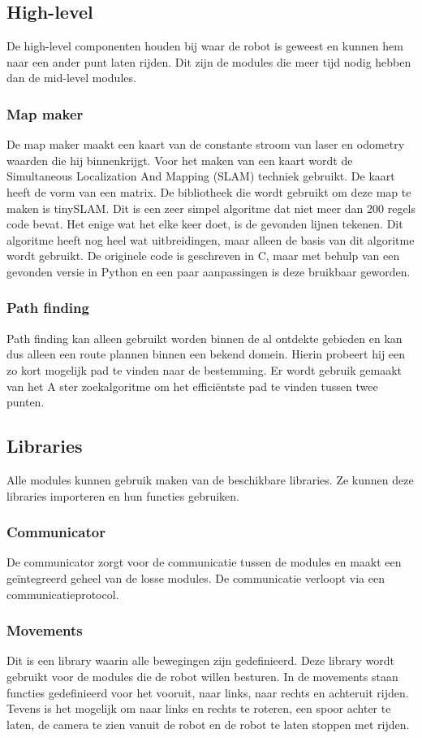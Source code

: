 \documentclass[a4paper,10pt]{article}
\begin{document}
\subsection{High-level}
De high-level componenten houden bij waar de robot is geweest en kunnen hem naar een ander punt laten rijden. Dit zijn de modules die meer tijd nodig hebben dan de mid-level modules.

\subsubsection{Map maker}
De map maker maakt een kaart van de constante stroom van laser en odometry waarden die hij binnenkrijgt. Voor het maken van een kaart wordt de Simultaneous Localization And Mapping (SLAM) techniek gebruikt. De kaart heeft de vorm van een matrix.
De bibliotheek die wordt gebruikt om deze map te maken is tinySLAM. Dit is een zeer simpel algoritme dat niet meer dan 200 regels code bevat. Het enige wat het elke keer doet, is de gevonden lijnen tekenen. Dit algoritme heeft nog heel wat uitbreidingen, maar alleen de basis van dit algoritme wordt gebruikt. De originele code is geschreven in C, maar met behulp van een gevonden versie in Python en een paar aanpassingen is deze bruikbaar geworden.

\subsubsection{Path finding}
Path finding kan alleen gebruikt worden binnen de al ontdekte gebieden en kan dus alleen een route plannen binnen een bekend domein. Hierin probeert hij een zo kort mogelijk pad te vinden naar de bestemming. Er wordt gebruik gemaakt van het A ster zoekalgoritme om het effici\"{e}ntste pad te vinden tussen twee punten.
\subsection{Libraries}
Alle modules kunnen gebruik maken van de beschikbare libraries. Ze kunnen deze libraries importeren en hun functies gebruiken.

\subsubsection{Communicator}
De communicator zorgt voor de communicatie tussen de modules en maakt een ge\"{i}ntegreerd geheel van de losse modules. De communicatie verloopt via een communicatieprotocol.

\subsubsection{Movements}
Dit is een library waarin alle bewegingen zijn gedefinieerd. Deze library wordt gebruikt voor de modules die de robot willen besturen. In de movements staan functies gedefinieerd voor het vooruit, naar links, naar rechts en achteruit rijden. Tevens is het mogelijk om naar links en rechts te roteren, een spoor achter te laten, de camera te zien vanuit de robot en de robot te laten stoppen met rijden.
\end{document}
